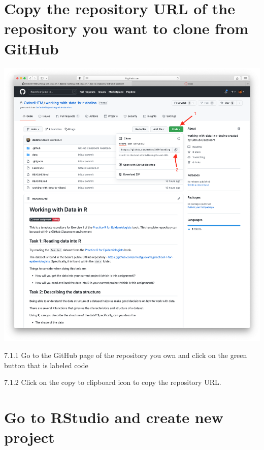 \documentclass[
  12pt,
]{book}
\begin{document}
\hypertarget{copy-the-repository-url-of-the-repository-you-want-to-clone-from-github}{%
\section{Copy the repository URL of the repository you want to clone from GitHub}\label{copy-the-repository-url-of-the-repository-you-want-to-clone-from-github}}

\includegraphics{images/clone_step1.png}

7.1.1 Go to the GitHub page of the repository you own and click on the green button that is labeled code

7.1.2 Click on the copy to clipboard icon to copy the repository URL.

\hypertarget{go-to-rstudio-and-create-new-project}{%
\section{Go to RStudio and create new project}\label{go-to-rstudio-and-create-new-project}}
\end{document}
